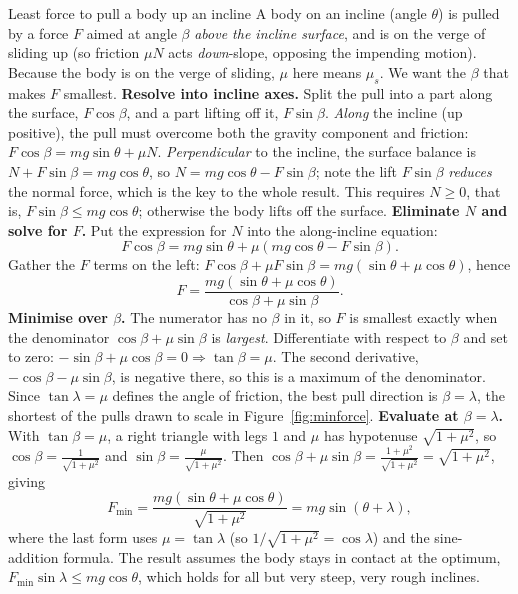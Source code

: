 \begin{derivbox}{Least force to pull a body up an incline}
A body on an incline (angle $\theta$) is pulled by a force $F$ aimed at angle $\beta$ \emph{above the
incline surface}, and is on the verge of sliding up (so friction $\mu N$ acts \emph{down}-slope,
opposing the impending motion). Because the body is on the verge of sliding, $\mu$ here means
$\mu_s$. We want the $\beta$ that makes $F$ smallest.
 \textbf{Resolve into incline axes.} Split the pull into a part along the surface, $F\cos\beta$,
and a part lifting off it, $F\sin\beta$. \emph{Along} the incline (up positive), the pull must overcome
both the gravity component and friction:
$F\cos\beta=mg\sin\theta+\mu N$. \emph{Perpendicular} to the incline, the surface balance is
$N+F\sin\beta=mg\cos\theta$, so $N=mg\cos\theta-F\sin\beta$; note the lift $F\sin\beta$
\emph{reduces} the normal force, which is the key to the whole result. This requires $N\ge0$, that is,
$F\sin\beta\le mg\cos\theta$; otherwise the body lifts off the surface.
 \textbf{Eliminate $N$ and solve for $F$.} Put the expression for $N$ into the along-incline
equation:
\[
F\cos\beta=mg\sin\theta+\mu(mg\cos\theta-F\sin\beta).
\]
Gather the $F$ terms on the left: $F\cos\beta+\mu F\sin\beta=mg(\sin\theta+\mu\cos\theta)$, hence
\[
F=\frac{mg(\sin\theta+\mu\cos\theta)}{\cos\beta+\mu\sin\beta}.
\]
 \textbf{Minimise over $\beta$.} The numerator has no $\beta$ in it, so $F$ is smallest exactly
when the denominator $\cos\beta+\mu\sin\beta$ is \emph{largest}. Differentiate with respect to $\beta$ and set to zero:
$-\sin\beta+\mu\cos\beta=0\Rightarrow\tan\beta=\mu$. The second derivative, $-\cos\beta-\mu\sin\beta$,
is negative there, so this is a maximum of the denominator. Since $\tan\lambda=\mu$ defines the angle of
friction, the best pull direction is $\beta=\lambda$, the shortest of the pulls drawn to scale in
Figure~\ref{fig:minforce}.
 \textbf{Evaluate at $\beta=\lambda$.} With $\tan\beta=\mu$, a right triangle with legs $1$
and $\mu$ has hypotenuse $\sqrt{1+\mu^2}$, so $\cos\beta=\tfrac{1}{\sqrt{1+\mu^2}}$ and
$\sin\beta=\tfrac{\mu}{\sqrt{1+\mu^2}}$. Then
$\cos\beta+\mu\sin\beta=\tfrac{1+\mu^2}{\sqrt{1+\mu^2}}=\sqrt{1+\mu^2}$, giving
\[
F_{\min}=\frac{mg(\sin\theta+\mu\cos\theta)}{\sqrt{1+\mu^2}}=mg\sin(\theta+\lambda),
\]
where the last form uses $\mu=\tan\lambda$ (so $1/\sqrt{1+\mu^2}=\cos\lambda$) and the sine-addition
formula. The result assumes the body stays in contact at the optimum, $F_{\min}\sin\lambda\le
mg\cos\theta$, which holds for all but very steep, very rough inclines.
\end{derivbox}

